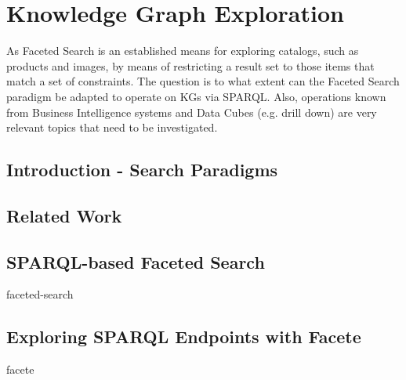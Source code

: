 \chapter{Knowledge Graph Exploration}
As Faceted Search is an established means for exploring catalogs, such as products and images,
by means of restricting a result set to those items that match a set of constraints.
The question is to what extent can the Faceted Search paradigm be adapted to operate on KGs via SPARQL.
Also, operations known from Business Intelligence systems and Data Cubes (e.g. drill down) are very relevant topics
that need to be investigated.

\section{Introduction - Search Paradigms}

\section{Related Work}

\section{SPARQL-based Faceted Search}
{
\let\section\subsection
\let\subsection\subsubsection
{faceted-search}
}

\section{Exploring SPARQL Endpoints with Facete}
{
\let\section\subsection
\let\subsection\subsubsection
{facete}
}


